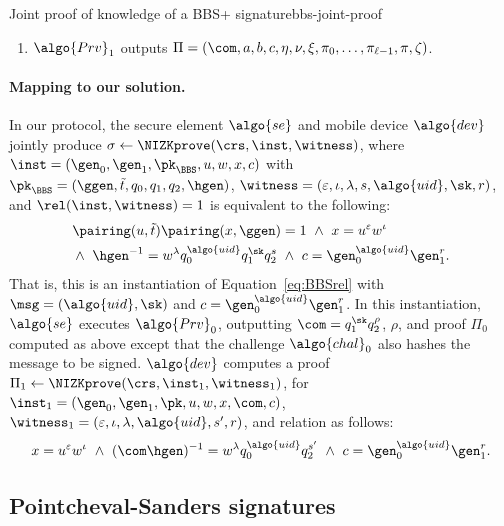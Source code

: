 \begin{primitivebox}{Joint proof of knowledge of a BBS+
  signature}{bbs-joint-proof}
\begin{description}
\begin{enumerate}
        \item $\algo{Prv}_1$ outputs $\Pi = (\com, a, b, c, \eta, \nu, \xi,
          \pi_0, \ldots, \pi_{\ell-1}, \pi, \zeta)$.

        \end{enumerate}

    \end{description}

  \end{primitivebox}

  \paragraph{Mapping to our solution.}\label{sec:pok-sol} In our protocol, the
  secure element $\algo{se}$ and mobile device $\algo{dev}$ jointly produce
  $\sigma \leftarrow \NIZKprove(\crs, \inst, \witness)$, where $\inst =
  (\gen_0, \gen_1, \pk_{\BBS}, u, w, x, c)$ with $\pk_{\BBS} = (\ggen,
  \tilde{t}, q_0, q_1, q_2, \hgen)$, $\witness = (\varepsilon, \iota, \lambda,
  s, \algo{uid}, \sk, r)$, and $\rel(\inst, \witness) = 1$ is equivalent to the
  following: \begin{align*} &\pairing(u, \tilde{t}) \pairing(x, \ggen) = 1 \
  \wedge \ x = u^\varepsilon w^\iota \\ &\wedge \ \hgen^{-1} = w^\lambda
q_0^{\algo{uid}} q_1^{\sk} q_2^s \ \wedge \ c = \gen_0^{\algo{uid}} \gen_1^r.
\end{align*} That is, this is an instantiation of Equation~\eqref{eq:BBSrel}
with $\msg = (\algo{uid}, \sk)$ and $c = \gen_0^{\algo{uid}} \gen_1^r$. In this
instantiation, $\algo{se}$ executes $\algo{Prv}_0$, outputting $\com =
q_1^{\sk} q_2^\rho$, $\rho$, and proof $\Pi_0$ computed as above except that
the challenge $\algo{chal}_0$ also hashes the message to be signed.
$\algo{dev}$ computes a proof $\Pi_1 \leftarrow \NIZKprove(\crs, \inst_1,
\witness_1)$, for $\inst_1 = (\gen_0, \gen_1, \pk, u, w, x, \com, c)$,
$\witness_1 = (\varepsilon, \iota, \lambda, \algo{uid}, s', r)$, and relation
as follows:
%
\begin{equation*}
%
  x = u^\varepsilon w^\iota \ \wedge \ (\com \hgen)^{-1} = w^\lambda
  q_0^{\algo{uid}} q_2^{s'} \ \wedge \ c = \gen_0^{\algo{uid}} \gen_1^r.
\end{equation*}
%

\subsection{Pointcheval-Sanders signatures}\label{sec:ps-sign}

